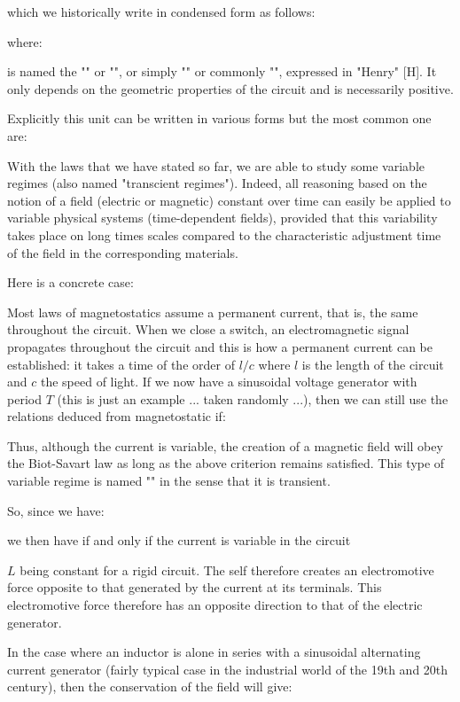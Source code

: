 	which we historically write in condensed form as follows:
	
	where:
	
	is named the "" or "", or simply "" or commonly "", expressed in "Henry" [H]. It only depends on the geometric properties of the circuit and is necessarily positive.
	
	Explicitly this unit can be written in various forms but the most common one are:
	
	
	With the laws that we have stated so far, we are able to study some variable regimes (also named "transcient regimes"). Indeed, all reasoning based on the notion of a field (electric or magnetic) constant over time can easily be applied to variable physical systems (time-dependent fields), provided that this variability takes place on long times scales  compared to the characteristic adjustment time of the field in the corresponding materials. 

	Here is a concrete case:

	Most laws of magnetostatics assume a permanent current, that is, the same throughout the circuit. When we close a switch, an electromagnetic signal propagates throughout the circuit and this is how a permanent current can be established: it takes a time of the order of $l / c$ where $l$ is the length of the circuit and $c$ the speed of light. If we now have a sinusoidal voltage generator with period $T$ (this is just an example ... taken randomly ...), then we can still use the relations deduced from magnetostatic if:
	
	Thus, although the current is variable, the creation of a magnetic field will obey the Biot-Savart law as long as the above criterion remains satisfied. This type of variable regime is named "" in the sense that it is transient.
	
	So, since we have:
	
	we then have if and only if the current is variable in the circuit
	
	$L$ being constant for a rigid circuit. The self therefore creates an electromotive force opposite to that generated by the current at its terminals. This electromotive force therefore has an opposite direction to that of the electric generator.
	
	In the case where an inductor is alone in series with a sinusoidal alternating current generator (fairly typical case in the industrial world of the 19th and 20th century), then the conservation of the field will give:
	
